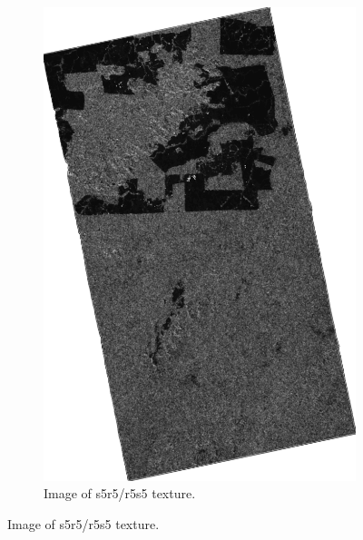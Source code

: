 \begin{figure}[H]
\begin{subfigure}[b]{0.4\linewidth}
    \includegraphics[width=\linewidth]{Chapter4/laws_textures/s5r5_r5s5image.png}
     \caption{Image of s5r5/r5s5 texture.}
  \end{subfigure}
\end{figure}
\newpage
